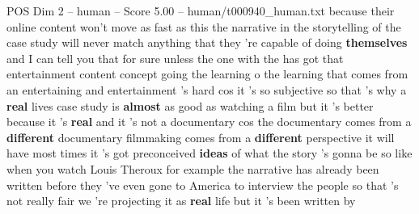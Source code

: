 \begin{textsample}{POS Dim 2 – human – Score 5.00 – human/t000940\_human.txt}  \label{ex:f2_pos_039}
because their online content won't move as fast as this the narrative in the storytelling of the case study will never match anything that they 're capable of doing \textbf{themselves} and I can tell you that for sure unless the one with the has got that entertainment content concept going the learning o the learning that comes from an entertaining and entertainment 's hard cos it 's so subjective so that 's why a \textbf{real} lives case study is \textbf{almost} as good as watching a film but it 's better because it 's \textbf{real} and it 's not a documentary cos the documentary comes from a \textbf{different} documentary filmmaking comes from a \textbf{different} perspective it will have most times it 's got preconceived \textbf{ideas} of what the story 's gonna be so like when you watch Louis Theroux for example the narrative has already been written before they 've even gone to America to interview the people so that 's not really fair we 're projecting it as \textbf{real} life but it 's been written by

\end{textsample}
